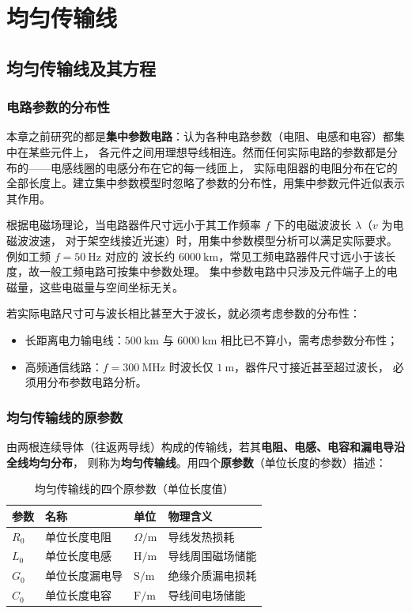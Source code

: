 \chapter{均匀传输线}

\section{均匀传输线及其方程}

\subsection{电路参数的分布性}
本章之前研究的都是\textbf{集中参数电路}：认为各种电路参数（电阻、电感和电容）都集中在某些元件上，
各元件之间用理想导线相连。然而任何实际电路的参数都是分布的——电感线圈的电感分布在它的每一线匝上，
实际电阻器的电阻分布在它的全部长度上。建立集中参数模型时忽略了参数的分布性，用集中参数元件近似表示其作用。

根据电磁场理论，当电路器件尺寸远小于其工作频率 $f$ 下的电磁波波长 $\lambda$（$v$ 为电磁波波速，
对于架空线接近光速）时，用集中参数模型分析可以满足实际要求。例如工频 $f=50\ \mathrm{Hz}$ 对应的
波长约 $6000\ \mathrm{km}$，常见工频电路器件尺寸远小于该长度，故一般工频电路可按集中参数处理。
集中参数电路中只涉及元件端子上的电磁量，这些电磁量与空间坐标无关。

若实际电路尺寸可与波长相比甚至大于波长，就必须考虑参数的分布性：
\begin{itemize}
  \item 长距离电力输电线：$500\ \mathrm{km}$ 与 $6000\ \mathrm{km}$ 相比已不算小，需考虑参数分布性；
  \item 高频通信线路：$f=300\ \mathrm{MHz}$ 时波长仅 $1\ \mathrm{m}$，器件尺寸接近甚至超过波长，
        必须用分布参数电路分析。
\end{itemize}

\subsection{均匀传输线的原参数}
由两根连续导体（往返两导线）构成的传输线，若其\textbf{电阻、电感、电容和漏电导沿全线均匀分布}，
则称为\textbf{均匀传输线}。用四个\textbf{原参数}（单位长度的参数）描述：
\begin{table}[htbp]
  \centering
  \renewcommand{\tablename}{表}%
  \caption{均匀传输线的四个原参数（单位长度值）}
  \begin{tabular}{llll}
    \toprule
    参数 & 名称 & 单位 & 物理含义 \\
    \midrule
    $R_0$ & 单位长度电阻 & $\Omega/\mathrm{m}$ & 导线发热损耗 \\
    $L_0$ & 单位长度电感 & $\mathrm{H/m}$ & 导线周围磁场储能 \\
    $G_0$ & 单位长度漏电导 & $\mathrm{S/m}$ & 绝缘介质漏电损耗 \\
    $C_0$ & 单位长度电容 & $\mathrm{F/m}$ & 导线间电场储能 \\
    \bottomrule
  \end{tabular}
\end{table}

